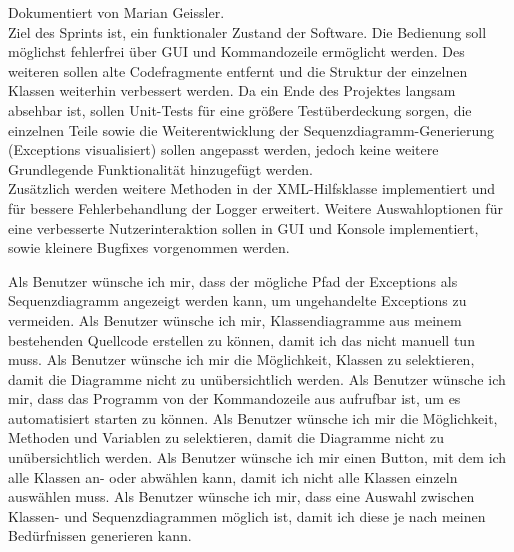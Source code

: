 Dokumentiert von Marian Geissler.\\
Ziel des Sprints ist, ein funktionaler Zustand der Software. Die Bedienung soll möglichst fehlerfrei über GUI und Kommandozeile ermöglicht werden. Des weiteren sollen alte Codefragmente entfernt und die Struktur der einzelnen Klassen weiterhin verbessert werden. Da ein Ende des Projektes langsam absehbar ist, sollen Unit-Tests für eine größere Testüberdeckung sorgen, die einzelnen Teile sowie die Weiterentwicklung der Sequenzdiagramm-Generierung (Exceptions visualisiert) sollen angepasst werden, jedoch keine weitere Grundlegende Funktionalität hinzugefügt werden. \\
Zusätzlich werden weitere Methoden in der XML-Hilfsklasse implementiert und für bessere Fehlerbehandlung der Logger erweitert. Weitere Auswahloptionen für eine verbesserte Nutzerinteraktion sollen in GUI und Konsole implementiert, sowie kleinere Bugfixes vorgenommen werden.\\


\nsecend

Als Benutzer wünsche ich mir, dass der mögliche Pfad der Exceptions als Sequenzdiagramm angezeigt werden kann, um ungehandelte Exceptions zu vermeiden.
\nsecend
{}
Als Benutzer wünsche ich mir, Klassendiagramme aus meinem bestehenden Quellcode erstellen zu können, damit ich das nicht manuell tun muss.
\nsecend
{}
Als Benutzer wünsche ich mir die Möglichkeit, Klassen zu selektieren, damit die Diagramme nicht zu unübersichtlich werden.
\nsecend
{}
Als Benutzer wünsche ich mir, dass das Programm von der Kommandozeile aus aufrufbar ist, um es automatisiert starten zu können.
\nsecend
{}
Als Benutzer wünsche ich mir die Möglichkeit, Methoden und Variablen zu selektieren, damit die Diagramme nicht zu unübersichtlich werden.
\nsecend
{}
Als Benutzer wünsche ich mir einen Button, mit dem ich alle Klassen an- oder abwählen kann, damit ich nicht alle Klassen einzeln auswählen muss.
\nsecend
{}
Als Benutzer wünsche ich mir, dass eine Auswahl zwischen Klassen- und Sequenzdiagrammen möglich ist, damit ich diese je nach meinen Bedürfnissen generieren kann.
\nsecend

